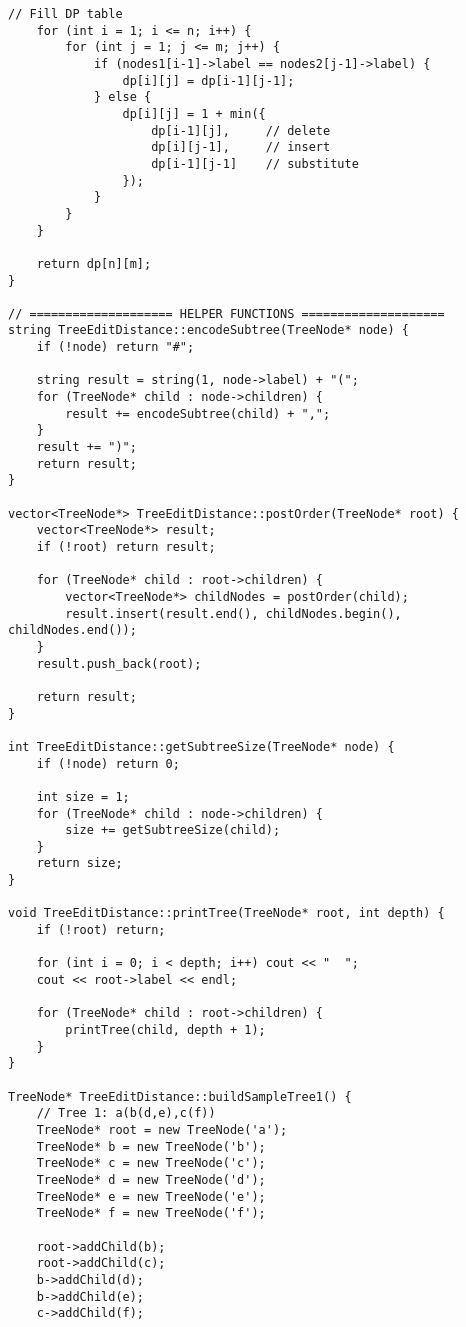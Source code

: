 \documentclass[12pt]{article}
\begin{document}
\begin{lstlisting}[caption=Complete Tree Edit Distance Implementation]
    // Fill DP table
    for (int i = 1; i <= n; i++) {
        for (int j = 1; j <= m; j++) {
            if (nodes1[i-1]->label == nodes2[j-1]->label) {
                dp[i][j] = dp[i-1][j-1];
            } else {
                dp[i][j] = 1 + min({
                    dp[i-1][j],     // delete
                    dp[i][j-1],     // insert
                    dp[i-1][j-1]    // substitute
                });
            }
        }
    }
    
    return dp[n][m];
}

// ==================== HELPER FUNCTIONS ====================
string TreeEditDistance::encodeSubtree(TreeNode* node) {
    if (!node) return "#";
    
    string result = string(1, node->label) + "(";
    for (TreeNode* child : node->children) {
        result += encodeSubtree(child) + ",";
    }
    result += ")";
    return result;
}

vector<TreeNode*> TreeEditDistance::postOrder(TreeNode* root) {
    vector<TreeNode*> result;
    if (!root) return result;
    
    for (TreeNode* child : root->children) {
        vector<TreeNode*> childNodes = postOrder(child);
        result.insert(result.end(), childNodes.begin(), childNodes.end());
    }
    result.push_back(root);
    
    return result;
}

int TreeEditDistance::getSubtreeSize(TreeNode* node) {
    if (!node) return 0;
    
    int size = 1;
    for (TreeNode* child : node->children) {
        size += getSubtreeSize(child);
    }
    return size;
}

void TreeEditDistance::printTree(TreeNode* root, int depth) {
    if (!root) return;
    
    for (int i = 0; i < depth; i++) cout << "  ";
    cout << root->label << endl;
    
    for (TreeNode* child : root->children) {
        printTree(child, depth + 1);
    }
}

TreeNode* TreeEditDistance::buildSampleTree1() {
    // Tree 1: a(b(d,e),c(f))
    TreeNode* root = new TreeNode('a');
    TreeNode* b = new TreeNode('b');
    TreeNode* c = new TreeNode('c');
    TreeNode* d = new TreeNode('d');
    TreeNode* e = new TreeNode('e');
    TreeNode* f = new TreeNode('f');
    
    root->addChild(b);
    root->addChild(c);
    b->addChild(d);
    b->addChild(e);
    c->addChild(f);
    

\end{lstlisting}
\end{document}
